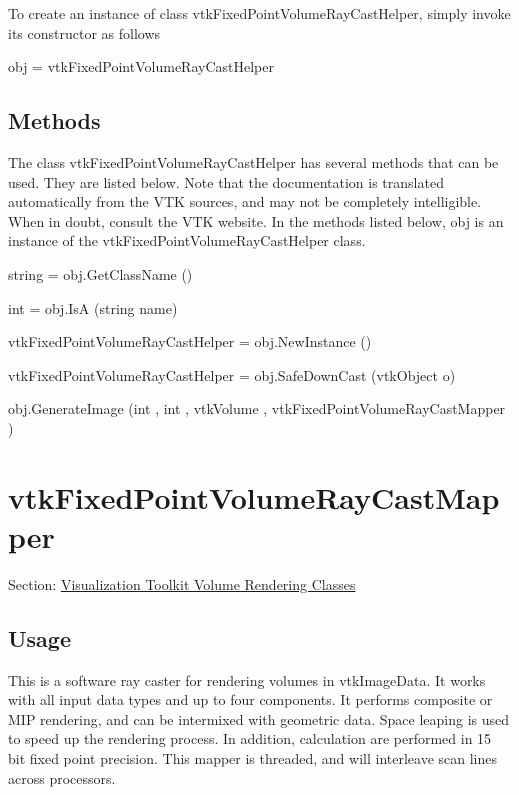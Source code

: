 To create an instance of class vtk\-Fixed\-Point\-Volume\-Ray\-Cast\-Helper, simply invoke its constructor as follows \begin{DoxyVerb}  obj = vtkFixedPointVolumeRayCastHelper
\end{DoxyVerb}
 \hypertarget{vtkwidgets_vtkxyplotwidget_Methods}{}\subsection{Methods}\label{vtkwidgets_vtkxyplotwidget_Methods}
The class vtk\-Fixed\-Point\-Volume\-Ray\-Cast\-Helper has several methods that can be used. They are listed below. Note that the documentation is translated automatically from the V\-T\-K sources, and may not be completely intelligible. When in doubt, consult the V\-T\-K website. In the methods listed below, {\ttfamily obj} is an instance of the vtk\-Fixed\-Point\-Volume\-Ray\-Cast\-Helper class. 
\begin{DoxyItemize}
\item {\ttfamily string = obj.\-Get\-Class\-Name ()}  
\item {\ttfamily int = obj.\-Is\-A (string name)}  
\item {\ttfamily vtk\-Fixed\-Point\-Volume\-Ray\-Cast\-Helper = obj.\-New\-Instance ()}  
\item {\ttfamily vtk\-Fixed\-Point\-Volume\-Ray\-Cast\-Helper = obj.\-Safe\-Down\-Cast (vtk\-Object o)}  
\item {\ttfamily obj.\-Generate\-Image (int , int , vtk\-Volume , vtk\-Fixed\-Point\-Volume\-Ray\-Cast\-Mapper )}  
\end{DoxyItemize}\hypertarget{vtkvolumerendering_vtkfixedpointvolumeraycastmapper}{}\section{vtk\-Fixed\-Point\-Volume\-Ray\-Cast\-Mapper}\label{vtkvolumerendering_vtkfixedpointvolumeraycastmapper}
Section\-: \hyperlink{sec_vtkvolumerendering}{Visualization Toolkit Volume Rendering Classes} \hypertarget{vtkwidgets_vtkxyplotwidget_Usage}{}\subsection{Usage}\label{vtkwidgets_vtkxyplotwidget_Usage}
This is a software ray caster for rendering volumes in vtk\-Image\-Data. It works with all input data types and up to four components. It performs composite or M\-I\-P rendering, and can be intermixed with geometric data. Space leaping is used to speed up the rendering process. In addition, calculation are performed in 15 bit fixed point precision. This mapper is threaded, and will interleave scan lines across processors.

